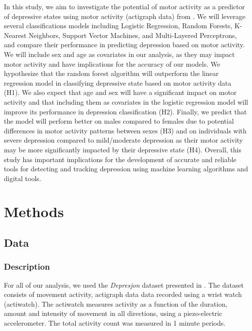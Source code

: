 \documentclass[11pt,a4paper]{article}
\newcommand{\noi}{\noindent}
\begin{document}
\noi
In this study, we aim to investigate the potential of motor activity as a predictor of depressive states using motor activity (actigraph data) from \cite{garcia2018depresjon}. We will leverage several classifications models including Logistic Regression, Random Forests, K-Nearest Neighbors, Support Vector Machines, and Multi-Layered Perceptrons, and compare their performance in predicting depression based on motor activity. We will include sex and age as covariates in our analysis, as they may impact motor activity and have implications for the accuracy of our models. We hypothesize that the random forest algorithm will outperform the linear regression model in classifying depressive state based on motor activity data (H1). We also expect that age and sex will have a significant impact on motor activity and that including them as covariates in the logistic regression model will improve its performance in depression classification (H2). Finally, we predict that the model will perform better on males compared to females due to potential differences in motor activity patterns between sexes (H3) and on individuals with severe depression compared to mild/moderate depression as their motor activity may be more significantly impacted by their depressive state (H4). Overall, this study has important implications for the development of accurate and reliable tools for detecting and tracking depression using machine learning algorithms and digital tools.

\section{Methods}
\subsection{Data}
\subsubsection{Description}
For all of our analysis, we used the \textit{Depresjon} dataset presented in \cite{garcia2018depresjon}. The dataset consists of movement activity, actigraph data data recorded using a wrist watch (actiwatch). The actiwatch measures activity as a function of the duration, amount and intensity of movement in all directions, using a piezo-electric accelerometer. The total activity count was measured in 1 minute periods.\\
\end{document}
